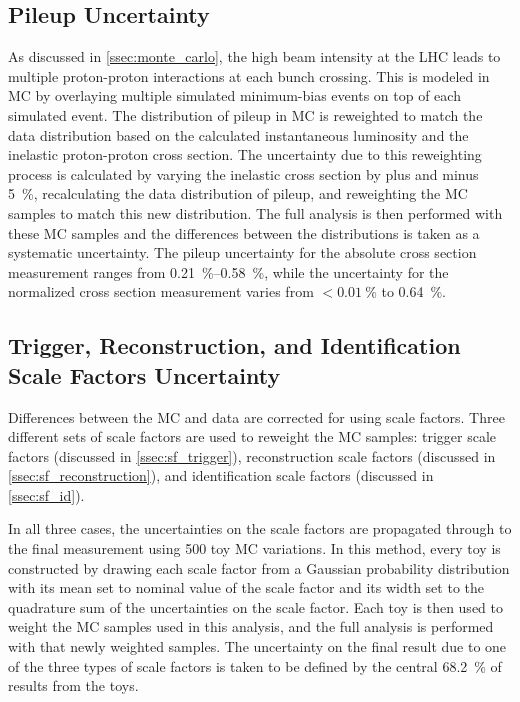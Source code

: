 \subsection{Pileup Uncertainty}
\label{ssec:pileup_uncertainty}

As discussed in \cref{ssec:monte_carlo}, the high beam intensity at the LHC
leads to multiple proton-proton interactions at each bunch crossing. This is
modeled in MC by overlaying multiple simulated minimum-bias events on top of
each simulated event. The distribution of pileup in MC is reweighted to match
the data distribution based on the calculated instantaneous luminosity and the
inelastic proton-proton cross section. The uncertainty due to this reweighting
process is calculated by varying the inelastic cross section by plus and minus
\SI{5}{\percent}, recalculating the data distribution of pileup, and
reweighting the MC samples to match this new distribution. The full analysis is
then performed with these MC samples and the differences between the \phistar
distributions is taken as a systematic uncertainty. The pileup uncertainty for
the absolute cross section measurement ranges from
\SIrange{0.21}{0.58}{\percent}, while the uncertainty for the normalized cross
section measurement varies from $< \SI{0.01}{\percent}$ to \SI{0.64}{\percent}.

\subsection{Trigger, Reconstruction, and Identification Scale Factors Uncertainty}
\label{scale_factor_uncertainty}

Differences between the MC and data are corrected for using scale factors.
Three different sets of scale factors are used to reweight the MC samples:
trigger scale factors (discussed in \cref{ssec:sf_trigger}), reconstruction
scale factors (discussed in \cref{ssec:sf_reconstruction}), and
identification scale factors (discussed in \cref{ssec:sf_id}).

In all three cases, the uncertainties on the scale factors are propagated
through to the final measurement using 500 toy MC variations. In this method,
every toy is constructed by drawing each scale factor from a Gaussian
probability distribution with its mean set to nominal value of the scale factor
and its width set to the quadrature sum of the uncertainties on the scale
factor. Each toy is then used to weight the MC samples used in this analysis,
and the full analysis is performed with that newly weighted samples. The
uncertainty on the final result due to one of the three types of scale factors
is taken to be defined by the central \SI{68.2}{\percent} of results from the
toys.

